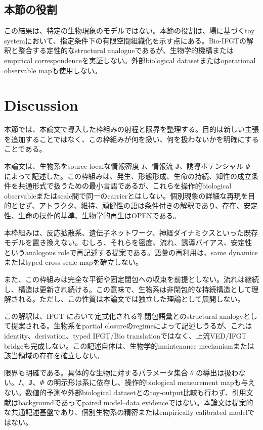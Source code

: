 \documentclass[11pt]{ltjsarticle}
\newcommand{\I}{I}
\newcommand{\J}{\mathbf{J}}
\newcommand{\PhiI}{\Phi}
\begin{document}
\subsection{本節の役割}

この結果は、特定の生物現象のモデルではない。本節の役割は、場に基づくtoy systemにおいて、指定条件下の有限空間組織化を示す点にある。Bio-IFGTの解釈と整合する定性的なstructural analogueであるが、生物学的機構またはempirical correspondenceを実証しない。外部biological datasetまたはoperational observable mapも使用しない。

\clearpage

\section{Discussion}

本節では、本論文で導入した枠組みの射程と限界を整理する。目的は新しい主張を追加することではなく、この枠組みが何を扱い、何を扱わないかを明確にすることである。

本論文は、生物系をsource-localな情報密度 \(\I\)、情報流 \(\J\)、誘導ポテンシャル \(\PhiI\) によって記述した。この枠組みは、発生、形態形成、生命の持続、知性の成立条件を共通形式で扱うための最小言語であるが、これらを操作的biological observableまたはscale間で同一のcarrierとはしない。個別現象の詳細な再現を目的とせず、アトラクタ、維持、頑健性の語は条件付きの解釈であり、存在、安定性、生命の操作的基準、生物学的再生はOPENである。

本枠組みは、反応拡散系、遺伝子ネットワーク、神経ダイナミクスといった既存モデルを置き換えない。むしろ、それらを密度、流れ、誘導バイアス、安定性というanalogous roleで再記述する提案である。語彙の再利用は、same dynamicsまたはtyped cross-scale mapを確立しない。

また、この枠組みは完全な平衡や固定閉包への収束を前提としない。流れは継続し、構造は更新され続ける。この意味で、生物系は非閉包的な持続構造として理解される。ただし、この性質は本論文では独立した理論として展開しない。

この解釈は、IFGT において定式化される準閉包語彙とのstructural analogyとして提案される。生物系をpartial closureのregimeによって記述しうるが、これはidentity、derivation、typed IFGT/Bio translationではなく、上流VED/IFGT bridgeも完成しない。この記述自体は、生物学的maintenance mechanismまたは該当領域の存在を確立しない。

限界も明確である。具体的な生物に対するパラメータ集合 \(\theta\) の導出は扱わない。\(\I\)、\(\J\)、\(\PhiI\) の明示形は系に依存し、操作的biological measurement mapも与えない。数値的予測や外部biological datasetとのtoy-output比較も行わず、引用文献はbackgroundであってpaired model--data evidenceではない。本論文は提案的な共通記述基盤であり、個別生物系の精密またはempirically calibrated modelではない。
\end{document}
